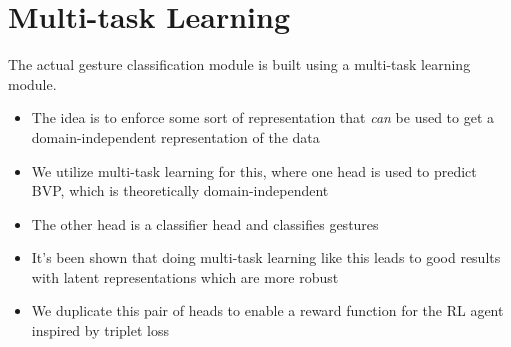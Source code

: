 \section{Multi-task Learning}\label{sec:methodology-multi-task-learning}

The actual gesture classification module is built using a multi-task learning module.

\begin{itemize}
	\item The idea is to enforce some sort of representation that \textit{can} be used to get a domain-independent representation of the data
	\item We utilize multi-task learning for this, where one head is used to predict BVP, which is theoretically domain-independent \cite{zheng2019zero}
	\item The other head is a classifier head and classifies gestures
	\item It's been shown that doing multi-task learning like this leads to good results with latent representations which are more robust \cite{tuggener2021deepscoresv2}
	\item We duplicate this pair of heads to enable a reward function for the RL agent inspired by triplet loss
\end{itemize}
